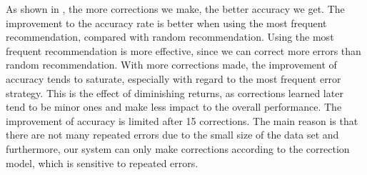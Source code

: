 
As shown in , the more corrections we make, 
the better accuracy we get. 
The improvement to the accuracy rate is better 
when using the most frequent recommendation, compared with random 
recommendation. Using the most 
frequent recommendation is more effective, 
since we can correct more errors than random recommendation. 
With more corrections made, the improvement of 
accuracy tends to saturate, especially with regard to the 
most frequent error strategy. This is the effect of diminishing
returns, as corrections learned later tend to be minor ones and make
less impact to the overall performance.
The improvement of accuracy is limited after 15 corrections. 
The main reason is that there are not many repeated errors due to 
the small size of the data set and furthermore, our system 
can only make corrections according to the correction model, 
which is sensitive to repeated errors.






